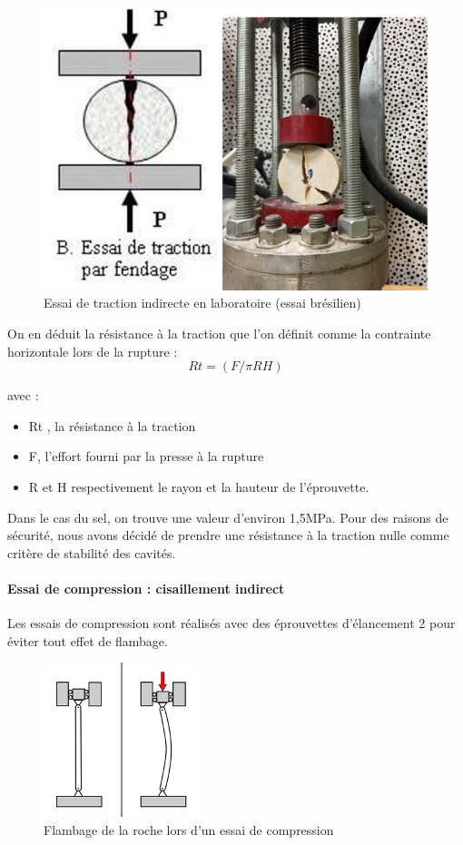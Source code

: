 \documentclass[11pt,french,a4paper]{article}
\begin{document}
\begin{figure}[h]
\centering
\includegraphics[width=.5\linewidth]{image/annexe/annexe_D/D2.png}
\caption{Essai de traction indirecte en laboratoire (essai brésilien)}
\label{fig:d2}
\end{figure}

\FloatBarrier
On en déduit la résistance à la traction que l’on définit comme la contrainte horizontale lors de la rupture : 
$$Rt = (F/ \pi RH)$$
 
avec : 
\begin{itemize}
\item Rt , la résistance à la traction 
\item F, l’effort fourni par la presse à la rupture 
\item R et H respectivement le rayon et la hauteur de l’éprouvette. 
\end{itemize}

Dans le cas du sel, on trouve une valeur d’environ 1,5MPa. Pour des raisons de sécurité, nous avons décidé de prendre une résistance à la traction nulle comme critère de stabilité des cavités. 


\paragraph{Essai de compression : cisaillement indirect }

Les essais de compression sont réalisés avec des éprouvettes d’élancement 2 pour éviter tout effet de flambage.

\begin{figure}[h]
\centering
\includegraphics[width=.3\linewidth]{image/annexe/annexe_D/D3.png}
\caption{Flambage de la roche lors d’un essai de compression}
\label{fig:d3}
\end{figure}
\FloatBarrier
\end{document}
